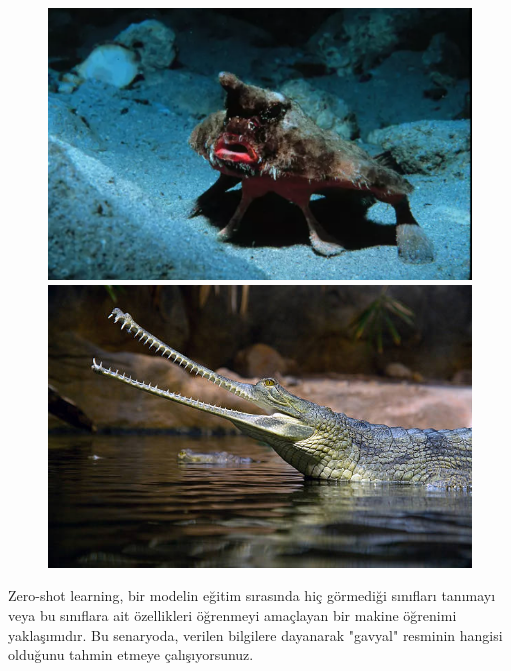 \documentclass[10pt,a4paper]{report}
\begin{document}
\begin{landscape}
\begin{figure}[!h]
			\vspace{0.5cm}
			
			\begin{minipage}[b]{0.470\linewidth}
				\centering
				\includegraphics[width=\linewidth]{Resim3}
				\caption{\cite{ceylan2014hayvanlar}}
			\end{minipage}\hfill
			\begin{minipage}[b]{0.470\linewidth}
				\centering
				\includegraphics[width=\linewidth]{Resim4}
				\caption{\cite{stokfoto}}
			\end{minipage}
			
		\end{figure}
		
	\end{landscape}
	
	Zero-shot learning, bir modelin eğitim sırasında hiç görmediği sınıfları tanımayı veya bu sınıflara ait özellikleri öğrenmeyi amaçlayan bir makine öğrenimi yaklaşımıdır. Bu senaryoda, verilen bilgilere dayanarak "gavyal" resminin hangisi olduğunu tahmin etmeye çalışıyorsunuz.
	
\end{document}
